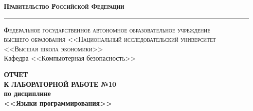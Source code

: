 \documentclass[a4paper, 12pt]{article}
\begin{document}
\begin{titlepage}

\begin{center}
{\textsc{\textbf{Правительство Российской Федерации}}}\\
\vspace{0.5cm}
\hrule
\vspace{0.5cm}
{\textsc{Федеральное государственное автономное образовательное учреждение\\высшего образования <<Национальный исследовательский университет\\<<Высшая школа экономики>>}}\\
\vspace{1cm}
Кафедра <<Компьютерная безопасность>>
\end{center}

\vspace{\fill}
\begin{center}
{\Large{\textbf{ОТЧЕТ \\ К ЛАБОРАТОРНОЙ РАБОТЕ №10}}} \\
\vspace{1em}
{\textbf{по дисциплине}} \\
\vspace{1em}
{\large{\textbf{<<Языки программирования>>}}}
\end{center}

\vspace{\fill}


\begin{flushright}
  \begin{minipage}[center]{15cm}


\end{minipage}
\end{flushright}
\end{titlepage}
\end{document}
